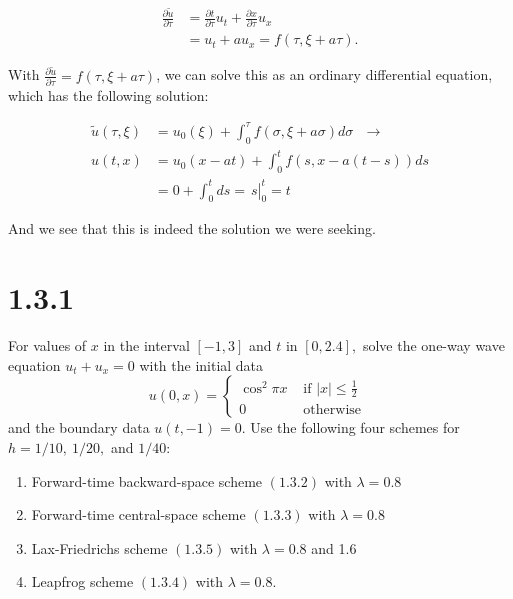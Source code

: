 \documentclass[12pt]{article}
\begin{document}
\begin{equation*}
\begin{aligned}
	 \frac{\partial\tilde{u}}{\partial\tau} &= \frac{\partial t}{\partial\tau}u_t + \frac{\partial x}{\partial\tau}u_x\\
	 &= u_t + au_x = f(\tau, \xi+a\tau).
\end{aligned}
\end{equation*}

\noindent With $\frac{\partial\tilde{u}}{\partial\tau}=f(\tau, \xi+a\tau)$, we can solve this as an ordinary differential equation, which has the following solution:

\begin{equation*}
\begin{aligned}
	\tilde{u}(\tau,\xi)& = u_0(\xi) + \int_0^\tau f(\sigma, \xi+a\sigma) d\sigma ~~~ \longrightarrow \\
	u(t,x) &= u_0(x-at) + \int_0^t f(s,x-a(t-s)) ds\\
	&= 0 + \int_0^t ds = \left.\frac{}{}s\right|_0^t = t
\end{aligned}
\end{equation*}

And we see that this is indeed the solution we were seeking.




\section*{1.3.1}

For values of $x$ in the interval $[-1,3]$ and $t$ in $[0,2.4],$ solve the one-way wave equation $u_{t}+u_{x}=0$ with the initial data
$$u(0, x)=\left\{\begin{array}{ll}
{\cos ^{2} \pi x} & {\text { if }|x| \leq \frac{1}{2}} \\
{0} & {\text { otherwise }}
\end{array}\right.$$
and the boundary data $u(t,-1)=0.$
Use the following four schemes for $h=1 / 10,~1 / 20,$ and $1 / 40$:
\begin{enumerate}
	\begin{enumerate}
		\item Forward-time backward-space scheme $(1.3 .2)$ with $\lambda=0.8$
		\item Forward-time central-space scheme $(1.3 .3)$ with $\lambda=0.8$
		\item Lax-Friedrichs scheme $(1.3 .5)$ with $\lambda=0.8$ and 1.6
		\item Leapfrog scheme $(1.3 .4)$ with $\lambda=0.8$.
	\end{enumerate}
\end{enumerate}
\end{document}
